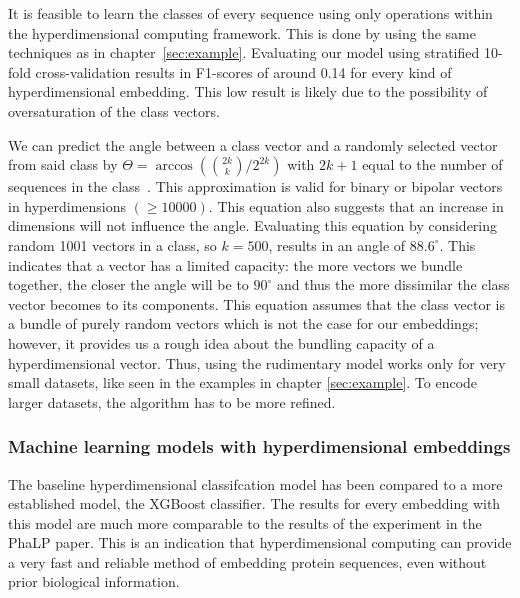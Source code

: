It is feasible to learn the classes of every sequence using only operations within the hyperdimensional computing framework. This is done by using the same techniques as in chapter~\ref{sec:example}. Evaluating our model using stratified 10-fold cross-validation results in F1-scores of around 0.14 for every kind of hyperdimensional embedding. This low result is likely due to the possibility of oversaturation of the class vectors.

We can predict the angle between a class vector and a randomly selected vector from said class by $\Theta = \arccos({2k \choose k}/2^{2k})$ with $2k+1$ equal to the number of sequences in the class~\cite{sathdv}. This approximation is valid for binary or bipolar vectors in hyperdimensions $(\ge 10000)$. This equation also suggests that an increase in dimensions will not influence the angle. Evaluating this equation by considering random 1001 vectors in a class, so $k = 500$, results in an angle of $88.6^{\circ}$. This indicates that a vector has a limited capacity: the more vectors we bundle together, the closer the angle will be to $90^{\circ}$ and thus the more dissimilar the class vector becomes to its components. This equation assumes that the class vector is a bundle of purely random vectors which is not the case for our embeddings; however, it provides us a rough idea about the bundling capacity of a hyperdimensional vector. Thus, using the rudimentary model works only for very small datasets, like seen in the examples in chapter \ref{sec:example}. To encode larger datasets, the algorithm has to be more refined.

\subsubsection*{Machine learning models with hyperdimensional embeddings}
The baseline hyperdimensional classifcation model has been compared to a more established model, the XGBoost classifier. The results for every embedding with this model are much more comparable to the results of the experiment in the PhaLP paper. This is an indication that hyperdimensional computing can provide a very fast and reliable method of embedding protein sequences, even without prior biological information.